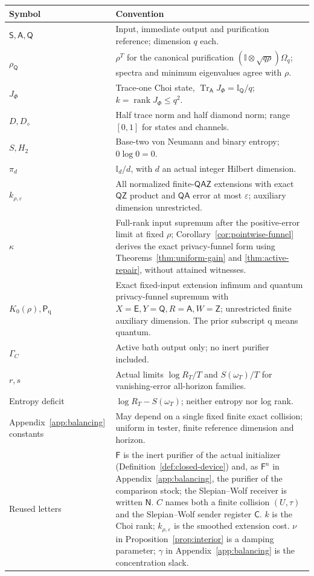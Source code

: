 \documentclass[11pt,a4paper]{article}
\numberwithin{equation}{section}
\theoremstyle{plain}
\theoremstyle{definition}
\DeclareMathOperator{\Tr}{Tr}
\DeclareMathOperator{\rank}{rank}
\newcommand{\rg}[1]{\mathsf{#1}}
\newcommand{\one}{\mathbb{I}}
\newcommand{\Dist}{D}                      %
\newcommand{\Ddiam}{D_{\diamond}}          %
\newcommand{\Pfun}{\mathsf{P}_{\mathrm{q}}}%
\begin{document}
\begin{center}
\small
\begin{tabular}{@{}>{\raggedright\arraybackslash}p{3.0cm}>{\raggedright\arraybackslash}p{11.4cm}@{}}
\hline
\textbf{Symbol} & \textbf{Convention}\\
\hline
$\rg{S},\rg{A},\rg{Q}$ & Input, immediate output and purification reference;
dimension $q$ each.\\
$\rho_{\rg{Q}}$ & $\rho^{T}$ for the canonical purification
$(\one\otimes\sqrt{q\rho})\Omega_q$; spectra and minimum eigenvalues agree
with $\rho$.\\
$J_\Phi$ & Trace-one Choi state, $\Tr_{\rg{A}}J_\Phi=\one_{\rg{Q}}/q$;
$k=\rank J_\Phi\le q^2$.\\
$\Dist,\Ddiam$ & Half trace norm and half diamond norm; range $[0,1]$ for
states and channels.\\
$S,H_2$ & Base-two von Neumann and binary entropy; $0\log 0=0$.\\
$\pi_d$ & $\one_d/d$, with $d$ an actual integer Hilbert dimension.\\
$k_{\rho,\varepsilon}$ & All normalized finite-$\rg{Q}\rg{A}\rg{Z}$
extensions with exact $\rg{Q}\rg{Z}$ product and $\rg{Q}\rg{A}$ error at most
$\varepsilon$; auxiliary dimension unrestricted.\\
$\kappa$ & Full-rank input supremum after the positive-error limit at fixed
$\rho$; Corollary~\ref{cor:pointwise-funnel} derives the exact privacy-funnel
form using Theorems~\ref{thm:uniform-gain} and \ref{thm:active-repair},
without attained witnesses.\\
$K_0(\rho),\Pfun$ & Exact fixed-input extension infimum and quantum
privacy-funnel supremum with $X=\rg{E},Y=\rg{Q},R=\rg{A},W=\rg{Z}$;
unrestricted finite auxiliary dimension. The prior subscript $\mathrm{q}$
means quantum.\\
$\Gamma_C$ & Active bath output only; no inert purifier included.\\
$r,s$ & Actual limits $\log R_T/T$ and $S(\omega_T)/T$ for vanishing-error
all-horizon families.\\
Entropy deficit & $\log R_T-S(\omega_T)$; neither entropy nor log rank.\\
Appendix~\ref{app:balancing} constants & May depend on a single fixed finite
exact collision; uniform in tester, finite reference dimension and horizon.\\
Reused letters & $\rg{F}$ is the inert purifier of the actual initializer
(Definition~\ref{def:closed-device}) and, as $\rg{F}^n$ in
Appendix~\ref{app:balancing}, the purifier of the comparison stock; the
Slepian--Wolf receiver is written $\rg{N}$. $C$ names both a finite collision
$(U,\tau)$ and the Slepian--Wolf sender register $\rg{C}$. $k$ is the Choi
rank; $k_{\rho,\varepsilon}$ is the smoothed extension cost. $\nu$ in
Proposition~\ref{prop:interior} is a damping parameter; $\gamma$ in
Appendix~\ref{app:balancing} is the concentration slack.\\
\hline
\end{tabular}
\end{center}
\end{document}
